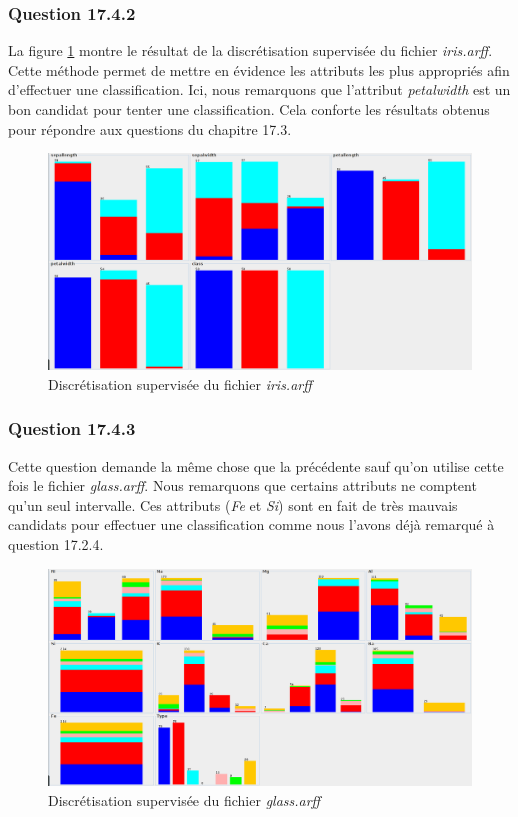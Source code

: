 \documentclass[11pt,a4paper]{article}
\begin{document}
			\subsubsection*{Question 17.4.2}
			
			La figure \ref{fig:iris:disc} montre le résultat de la discrétisation supervisée du fichier \textit{iris.arff}. Cette méthode permet de mettre en évidence les attributs les plus appropriés afin d'effectuer une classification. Ici, nous remarquons que l'attribut \textit{petalwidth} est un bon candidat pour tenter une classification. Cela conforte les résultats obtenus pour répondre aux questions du chapitre 17.3.
			
			\begin{figure}[h]
				\centering
				\includegraphics[width=\textwidth]{iris_disc}
				\caption{Discrétisation supervisée du fichier \textit{iris.arff}}
				\label{fig:iris:disc}
			\end{figure}
			
			
			\subsubsection*{Question 17.4.3}
			
			Cette question demande la même chose que la précédente sauf qu'on utilise cette fois le fichier \textit{glass.arff}. Nous remarquons que certains attributs ne comptent qu'un seul intervalle. Ces attributs (\textit{Fe} et \textit{Si}) sont en fait de très mauvais candidats pour effectuer une classification comme nous l'avons déjà remarqué à question 17.2.4. 
			
			\begin{figure}[h]
				\centering
				\includegraphics[width=\textwidth]{glass_disc_sup}
				\caption{Discrétisation supervisée du fichier \textit{glass.arff}}
				\label{fig:glass:disc:sup}
			\end{figure}
			
\end{document}
